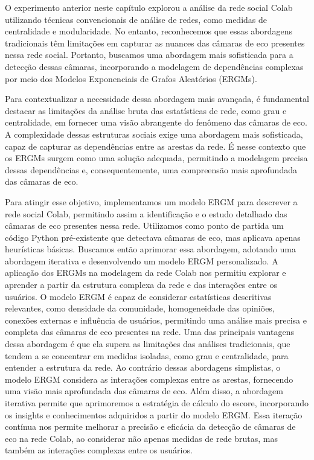 O experimento anterior neste capítulo explorou a análise da rede social Colab utilizando técnicas convencionais de análise de redes, como medidas de centralidade e modularidade. No entanto, reconhecemos que essas abordagens tradicionais têm limitações em capturar as nuances das câmaras de eco presentes nessa rede social. Portanto, buscamos uma abordagem mais sofisticada para a detecção dessas câmaras, incorporando a modelagem de dependências complexas por meio dos Modelos Exponenciais de Grafos Aleatórios (ERGMs).

Para contextualizar a necessidade dessa abordagem mais avançada, é fundamental destacar as limitações da análise bruta das estatísticas de rede, como grau e centralidade, em fornecer uma visão abrangente do fenômeno das câmaras de eco. A complexidade dessas estruturas sociais exige uma abordagem mais sofisticada, capaz de capturar as dependências entre as arestas da rede. É nesse contexto que os ERGMs surgem como uma solução adequada, permitindo a modelagem precisa dessas dependências e, consequentemente, uma compreensão mais aprofundada das câmaras de eco.

Para atingir esse objetivo, implementamos um modelo ERGM para descrever a rede social Colab, permitindo assim a identificação e o estudo detalhado das câmaras de eco presentes nessa rede. Utilizamos como ponto de partida um código Python pré-existente que detectava câmaras de eco, mas aplicava apenas heurísticas básicas. Buscamos então aprimorar essa abordagem, adotando uma abordagem iterativa e desenvolvendo um modelo ERGM personalizado. A aplicação dos ERGMs na modelagem da rede Colab nos permitiu explorar e aprender a partir da estrutura complexa da rede e das interações entre os usuários. O modelo ERGM é capaz de considerar estatísticas descritivas relevantes, como densidade da comunidade, homogeneidade das opiniões, conexões externas e influência de usuários, permitindo uma análise mais precisa e completa das câmaras de eco presentes na rede. Uma das principais vantagens dessa abordagem é que ela supera as limitações das análises tradicionais, que tendem a se concentrar em medidas isoladas, como grau e centralidade, para entender a estrutura da rede. Ao contrário dessas abordagens simplistas, o modelo ERGM considera as interações complexas entre as arestas, fornecendo uma visão mais aprofundada das câmaras de eco. Além disso, a abordagem iterativa permite que aprimoremos a estratégia de cálculo do escore, incorporando os insights e conhecimentos adquiridos a partir do modelo ERGM. Essa iteração contínua nos permite melhorar a precisão e eficácia da detecção de câmaras de eco na rede Colab, ao considerar não apenas medidas de rede brutas, mas também as interações complexas entre os usuários.

